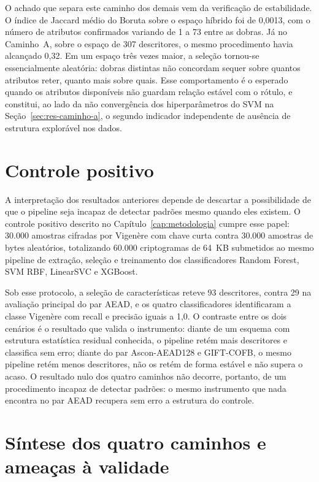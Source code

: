 O achado que separa este caminho dos demais vem da verificação de estabilidade. O índice de Jaccard médio do Boruta sobre o espaço híbrido foi de 0,0013, com o número de atributos confirmados variando de 1 a 73 entre as dobras. Já no Caminho~A, sobre o espaço de 307 descritores, o mesmo procedimento havia alcançado 0,32. Em um espaço três vezes maior, a seleção tornou-se essencialmente aleatória: dobras distintas não concordam sequer sobre quantos atributos reter, quanto mais sobre quais. Esse comportamento é o esperado quando os atributos disponíveis não guardam relação estável com o rótulo, e constitui, ao lado da não convergência dos hiperparâmetros do SVM na Seção~\ref{sec:res-caminho-a}, o segundo indicador independente de ausência de estrutura explorável nos dados.

\section{Controle positivo}
\label{sec:res-controle}

A interpretação dos resultados anteriores depende de descartar a possibilidade de que o pipeline seja incapaz de detectar padrões mesmo quando eles existem. O controle positivo descrito no Capítulo~\ref{cap:metodologia} cumpre esse papel: 30.000 amostras cifradas por Vigenère com chave curta contra 30.000 amostras de bytes aleatórios, totalizando 60.000 criptogramas de 64~KB submetidos ao mesmo pipeline de extração, seleção e treinamento dos classificadores Random Forest, SVM RBF, LinearSVC e XGBoost.

Sob esse protocolo, a seleção de características reteve 93 descritores, contra 29 na avaliação principal do par AEAD, e os quatro classificadores identificaram a classe Vigenère com recall e precisão iguais a 1,0. O contraste entre os dois cenários é o resultado que valida o instrumento: diante de um esquema com estrutura estatística residual conhecida, o pipeline retém mais descritores e classifica sem erro; diante do par Ascon-AEAD128 e GIFT-COFB, o mesmo pipeline retém menos descritores, não os retém de forma estável e não supera o acaso. O resultado nulo dos quatro caminhos não decorre, portanto, de um procedimento incapaz de detectar padrões: o mesmo instrumento que nada encontra no par AEAD recupera sem erro a estrutura do controle.

\section{Síntese dos quatro caminhos e ameaças à validade}
\label{sec:res-sintese}

